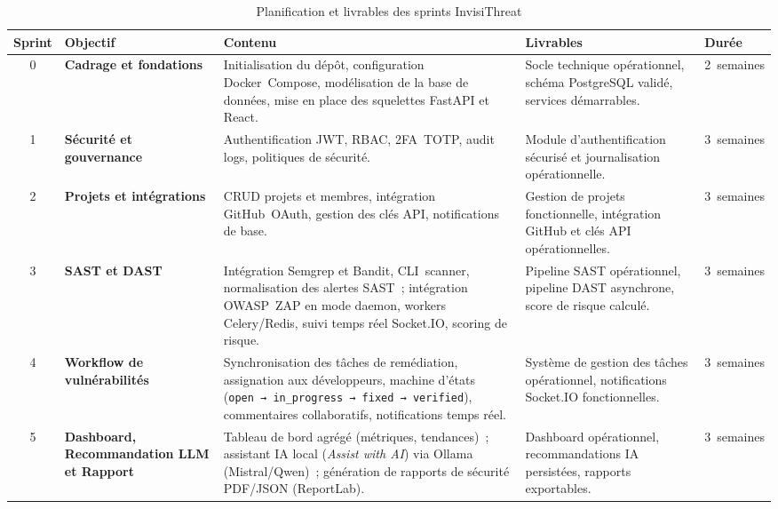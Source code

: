 \begin{table}[H]
\centering
\caption{Planification et livrables des sprints InvisiThreat}
\label{tab:sprints}
\small
\renewcommand{\arraystretch}{1.4}
\begin{tabularx}{\textwidth}{c p{2.8cm} X X p{1.8cm}}
\hline
\rowcolor{gray!15}
\textbf{Sprint} & \textbf{Objectif} & \textbf{Contenu} & \textbf{Livrables}
  & \textbf{Durée} \\
\hline
0 & \textbf{Cadrage et fondations}
  & Initialisation du dépôt, configuration Docker~Compose, modélisation de la
    base de données, mise en place des squelettes FastAPI et React.
  & Socle technique opérationnel, schéma PostgreSQL validé, services démarrables.
  & 2~semaines \\
\hline
1 & \textbf{Sécurité et gouvernance}
  & Authentification JWT, RBAC, 2FA~TOTP, audit logs, politiques de sécurité.
  & Module d'authentification sécurisé et journalisation opérationnelle.
  & 3~semaines \\
\hline
2 & \textbf{Projets et intégrations}
  & CRUD projets et membres, intégration GitHub~OAuth, gestion des clés API,
    notifications de base.
  & Gestion de projets fonctionnelle, intégration GitHub et clés API opérationnelles.
  & 3~semaines \\
\hline
3 & \textbf{SAST et DAST}
  & Intégration Semgrep et Bandit, CLI~scanner, normalisation des alertes SAST~;
    intégration OWASP~ZAP en mode daemon, workers Celery/Redis, suivi temps réel
    Socket.IO, scoring de risque.
  & Pipeline SAST opérationnel, pipeline DAST asynchrone, score de risque calculé.
  & 3~semaines \\
\hline
4 & \textbf{Workflow de vulnérabilités}
  & Synchronisation des tâches de remédiation, assignation aux développeurs,
    machine d'états (\texttt{open\,→\,in\_progress\,→\,fixed\,→\,verified}),
    commentaires collaboratifs, notifications temps réel.
  & Système de gestion des tâches opérationnel, notifications Socket.IO fonctionnelles.
  & 3~semaines \\
\hline
5 & \textbf{Dashboard, Recommandation LLM et Rapport}
  & Tableau de bord agrégé (métriques, tendances)~; assistant IA local
    (\textit{Assist with AI}) via Ollama (Mistral/Qwen)~;
    génération de rapports de sécurité PDF/JSON (ReportLab).
  & Dashboard opérationnel, recommandations IA persistées, rapports exportables.
  & 3~semaines \\
\hline
\end{tabularx}
\end{table}

